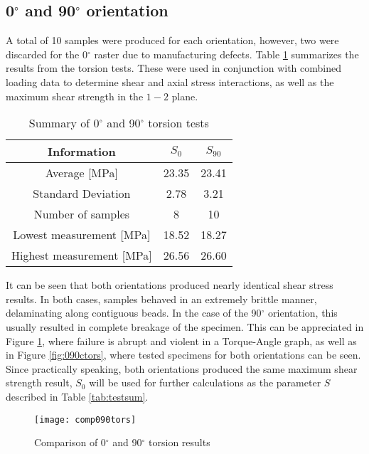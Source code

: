 \documentclass[main.tex]{subfiles}
\begin{document}
\subsection{0$^\circ$ and 90$^\circ$ orientation} \label{ssec:090r}

A total of 10 samples were produced for each orientation, however, two were discarded for the 0$^\circ$ raster due to manufacturing defects. Table \ref{tab:tors090r} summarizes the results from the torsion tests. These were used in conjunction with combined loading data to determine shear and axial stress interactions, as well as the maximum shear strength in the $1-2$ plane.

\begin{table} [h]
	\centering
	\caption{Summary of 0$^\circ$ and 90$^\circ$ torsion tests}
\begin{tabular}{ c| c c } 
	\toprule
	\textbf{Information} & $S_{0}$ & $S_{90}$\\
	\midrule
	Average [MPa] &23.35  & 23.41\\
	Standard Deviation &2.78 & 3.21\\
	Number of samples &8  & 10\\
	Lowest measurement [MPa] &18.52  & 18.27\\
	Highest measurement [MPa] &26.56 & 26.60\\
	\bottomrule
\end{tabular}
\label{tab:tors090r}
\end{table}


It can be seen that both orientations produced nearly identical shear stress results. In both cases, samples behaved in an extremely brittle manner, delaminating along contiguous beads. In the case of the 90$^\circ$ orientation, this usually resulted in complete breakage of the specimen. This can be appreciated in Figure \ref{fig:090comptors}, where failure is abrupt and violent in a Torque-Angle graph, as well as in Figure \ref{fig:090ctors}, where tested specimens for both orientations can be seen. Since practically speaking, both orientations produced the same maximum shear strength result, $S_0$ will be used for further calculations as the parameter $S$ described in Table \ref{tab:testsum}.

\newpage

\begin{figure}[!htbp]
	\center
	\texttt{[image: comp090tors]}
	\caption{Comparison of 0$^\circ$ and 90$^\circ$ torsion results} \label{fig:090comptors}
\end{figure}
\end{document}
